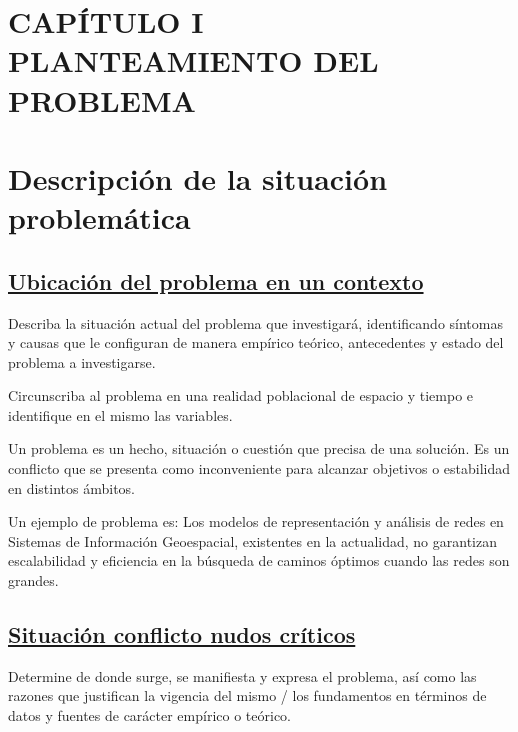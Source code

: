 \documentclass[12pt, a4paper, nofontenc, numbers=endperiod]{apa7}
\begin{document}
{
	\setlength\headsep{2.95cm}
	\addtolength{\textheight}{-2.45cm}
	\section*{\large \centering CAPÍTULO I \\ PLANTEAMIENTO DEL PROBLEMA}
	{\doublespacing
		\section{\normalsize \centering Descripción de la situación problemática} 
		\subsection*{\normalsize \underline{Ubicación del problema en un contexto}}
		\setlength{\parindent}{1.27cm}Describa la situación actual del problema que investigará, identificando síntomas y causas que le configuran de manera empírico teórico, antecedentes y estado del problema a investigarse.
		
		\setlength{\parindent}{1.27cm}Circunscriba al problema en una realidad poblacional de espacio y tiempo e identifique en el mismo las variables.
		
		\setlength{\parindent}{1.27cm}Un problema es un hecho, situación o cuestión que precisa de una solución. Es un conflicto que se presenta como inconveniente para alcanzar objetivos o estabilidad en distintos ámbitos.
		
		\setlength{\parindent}{1.27cm}Un ejemplo de problema es: Los modelos de representación y análisis de redes en Sistemas de Información Geoespacial, existentes en la actualidad, no garantizan escalabilidad y eficiencia en la búsqueda de caminos óptimos cuando las redes son grandes.
		\subsection*{\normalsize  \underline{Situación conflicto nudos críticos}}
		Determine de donde surge, se manifiesta y expresa el problema, así como las razones que justifican la vigencia del mismo / los fundamentos en términos de datos y fuentes de carácter empírico o teórico.
}}
\end{document}
